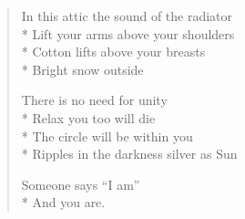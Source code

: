 \documentclass[english,11pt,letterpaper,onecolumn]{scrbook}
\begin{document}
\begin{verse}
In this attic the sound of the radiator \\*
Lift your arms above your shoulders \\*
Cotton lifts above your breasts \\*
Bright snow outside



There is no need for unity \\*
Relax you too will die \\*
The circle will be within you \\*
Ripples in the darkness silver as Sun



Someone says ``I am'' \\*
And you are.%

\dictum{}
\end{verse}

\newpage
{}
\end{document}
